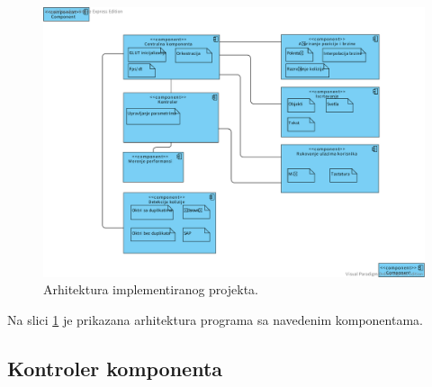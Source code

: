 \documentclass[12pt,oneside]{memoir}
\begin{document}
\begin{figure}[h!]
	\centerfloat
	\includegraphics[trim=150 50 100 50,clip,scale=0.6]{architecture.pdf}
	\caption{Arhitektura implementiranog projekta.}
	\label{fig:archi}
\end{figure}

Na slici \ref{fig:archi} je prikazana arhitektura programa sa navedenim komponentama.

\subsection{Kontroler komponenta}
\end{document}
